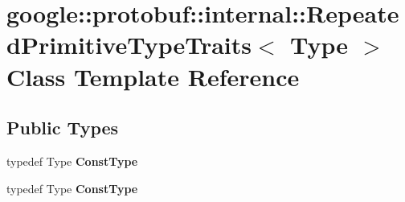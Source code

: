 \hypertarget{classgoogle_1_1protobuf_1_1internal_1_1RepeatedPrimitiveTypeTraits}{}\section{google\+:\+:protobuf\+:\+:internal\+:\+:Repeated\+Primitive\+Type\+Traits$<$ Type $>$ Class Template Reference}
\label{classgoogle_1_1protobuf_1_1internal_1_1RepeatedPrimitiveTypeTraits}
\subsection*{Public Types}
\begin{DoxyCompactItemize}
\item 
\mbox{\label{classgoogle_1_1protobuf_1_1internal_1_1RepeatedPrimitiveTypeTraits_aff39b048f11dcc5ab9c8501d5cb65e00}} 
typedef Type {\bfseries Const\+Type}
\item 
\mbox{\label{classgoogle_1_1protobuf_1_1internal_1_1RepeatedPrimitiveTypeTraits_aff39b048f11dcc5ab9c8501d5cb65e00}} 
typedef Type {\bfseries Const\+Type}
\end{DoxyCompactItemize}
